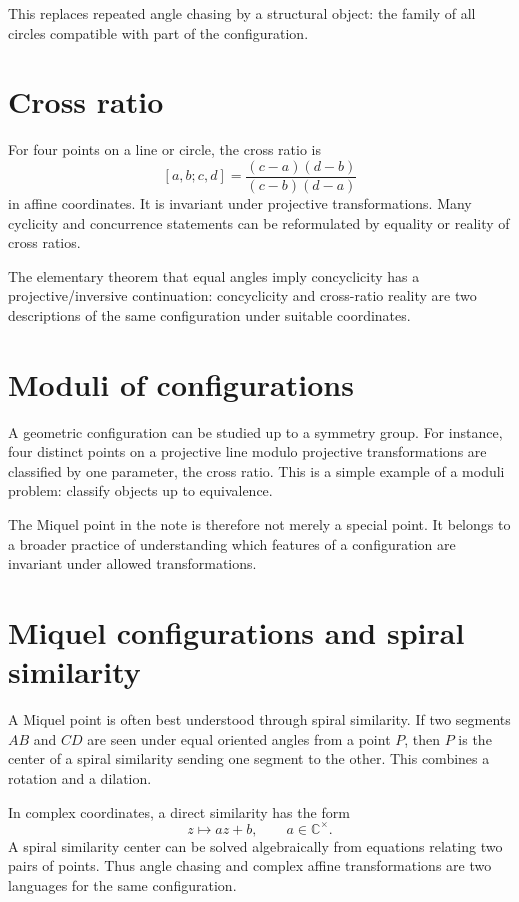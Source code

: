 This replaces repeated angle chasing by a structural object: the family of all circles compatible with part of the configuration.

\section{Cross ratio}

For four points on a line or circle, the cross ratio is
\[
  [a,b;c,d]=\frac{(c-a)(d-b)}{(c-b)(d-a)}
\]
in affine coordinates.  It is invariant under projective transformations.  Many cyclicity and concurrence statements can be reformulated by equality or reality of cross ratios.

The elementary theorem that equal angles imply concyclicity has a projective/inversive continuation: concyclicity and cross-ratio reality are two descriptions of the same configuration under suitable coordinates.

\section{Moduli of configurations}

A geometric configuration can be studied up to a symmetry group.  For instance, four distinct points on a projective line modulo projective transformations are classified by one parameter, the cross ratio.  This is a simple example of a moduli problem: classify objects up to equivalence.

The Miquel point in the note is therefore not merely a special point.  It belongs to a broader practice of understanding which features of a configuration are invariant under allowed transformations.

\section{Miquel configurations and spiral similarity}

A Miquel point is often best understood through spiral similarity.  If two segments $AB$ and $CD$ are seen under equal oriented angles from a point $P$, then $P$ is the center of a spiral similarity sending one segment to the other.  This combines a rotation and a dilation.

In complex coordinates, a direct similarity has the form
\[
  z\mapsto az+b,\qquad a\in\mathbb C^\times.
\]
A spiral similarity center can be solved algebraically from equations relating two pairs of points.  Thus angle chasing and complex affine transformations are two languages for the same configuration.

